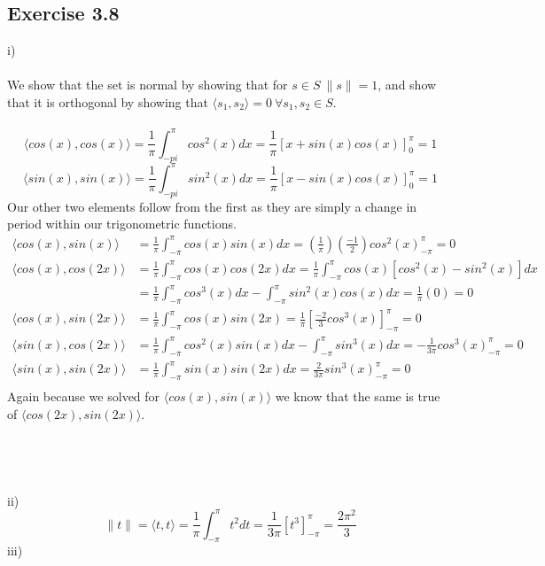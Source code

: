 \documentclass[letterpaper,12pt]{article}
\theoremstyle{definition}
\begin{document}
\subsection*{Exercise 3.8}
i) \\ \\
We show that the set is normal by showing that for $s\in S ~ \|s\| = 1$, and show that it is orthogonal by showing that $\langle s_{1}, s_{2} \rangle = 0 ~ \forall s_{1}, s_{2} \in S$. \\ \\
\[\langle  cos(x), cos(x)\rangle   = \frac{1}{\pi}\int ^{\pi}_{-pi} cos^2(x)dx = \frac{1}{\pi}[x+sin(x)cos(x)]^\pi_0 = 1\]
\[\langle  sin(x), sin(x)\rangle   = \frac{1}{\pi}\int ^{\pi}_{-pi} sin^2(x)dx = \frac{1}{\pi}[x-sin(x)cos(x)]^\pi_0 = 1\]
Our other two elements follow from the first as they are simply a change in period within our trigonometric functions.\\
\begin{align*}
\langle  cos(x), sin(x)\rangle   &= \frac{1}{\pi}\int ^\pi_{-\pi} cos(x)sin(x)dx = (\frac{1}{\pi})(\frac{-1}{2}) cos^2(x)_{-\pi}^\pi = 0 \\
\langle  cos(x), cos(2x)\rangle   &= \frac{1}{\pi}\int_{-\pi}^{\pi}cos(x)cos(2x)dx=\frac{1}{\pi}\int_{-\pi}^{\pi}cos(x)[cos^2(x)-sin^2(x)]dx \\
&=\frac{1}{\pi}\int_{-\pi}^{\pi}cos^3(x)dx-\int_{-\pi}^{\pi}sin^2(x)cos(x)dx = \frac{1}{\pi}(0)=0 \\
\langle  cos(x), sin(2x) \rangle   &= \frac{1}{\pi}\int_{-\pi}^{\pi}cos(x)sin(2x)=\frac{1}{\pi}[\frac{-2}{3}cos^3(x)]_{-\pi}^\pi=0 \\
\langle  sin(x), cos(2x) \rangle   &= \frac{1}{\pi}\int_{-\pi}^{\pi}cos^2(x)sin(x)dx-\int_{-\pi}^{\pi}sin^3(x)dx= -\frac{1}{3\pi}cos^3(x)_{-\pi}^\pi = 0 \\
\langle  sin(x),sin(2x)\rangle  &= \frac{1}{\pi}\int_{-\pi}^{\pi}sin(x)sin(2x)dx=\frac{2}{3\pi}sin^3(x)_{-\pi}^\pi = 0 \\
\end{align*}
Again because we solved for $\langle cos(x),sin(x) \rangle$ we know that the same is true of $\langle cos(2x),sin(2x) \rangle$.\\\\\\\\\\
ii)
\[\|t\| = \langle  t,t \rangle   = \frac{1}{\pi}\int_{-\pi}^{\pi}t^2dt = \frac{1}{3\pi}[t^3]^\pi_{-\pi}=\frac{2\pi^2}{3}\]
iii)
\end{document}
